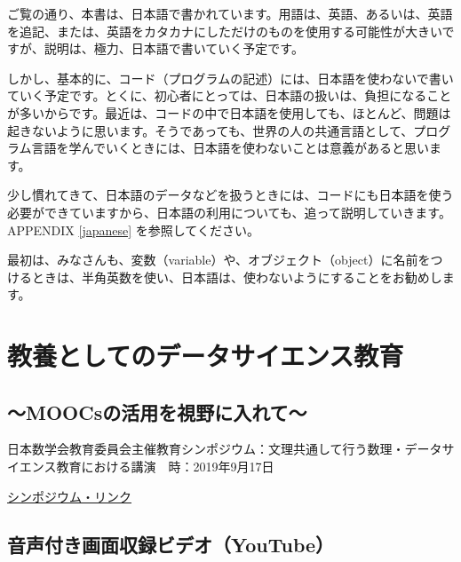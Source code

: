 \documentclass[
]{book}
\theoremstyle{definition}
\theoremstyle{definition}
\theoremstyle{definition}
\theoremstyle{definition}
\theoremstyle{remark}
\begin{document}
ご覧の通り、本書は、日本語で書かれています。用語は、英語、あるいは、英語を追記、または、英語をカタカナにしただけのものを使用する可能性が大きいですが、説明は、極力、日本語で書いていく予定です。

しかし、基本的に、コード（プログラムの記述）には、日本語を使わないで書いていく予定です。とくに、初心者にとっては、日本語の扱いは、負担になることが多いからです。最近は、コードの中で日本語を使用しても、ほとんど、問題は起きないように思います。そうであっても、世界の人の共通言語として、プログラム言語を学んでいくときには、日本語を使わないことは意義があると思います。

少し慣れてきて、日本語のデータなどを扱うときには、コードにも日本語を使う必要ができていますから、日本語の利用についても、追って説明していきます。APPENDIX \ref{japanese} を参照してください。

最初は、みなさんも、変数（variable）や、オブジェクト（object）に名前をつけるときは、半角英数を使い、日本語は、使わないようにすることをお勧めします。

\hypertarget{appendix-appendix}{%
\appendix}


\hypertarget{math2019}{%
\chapter{教養としてのデータサイエンス教育}\label{math2019}}

\hypertarget{moocsux306eux6d3bux7528ux3092ux8996ux91ceux306bux5165ux308cux3066}{%
\section*{～MOOCsの活用を視野に入れて～}\label{moocsux306eux6d3bux7528ux3092ux8996ux91ceux306bux5165ux308cux3066}}

日本数学会教育委員会主催教育シンポジウム：文理共通して行う数理・データサイエンス教育における講演　時：2019年9月17日

\href{https://www.mathsoc.jp/overview/committee/education/sympo/2019sep.html}{シンポジウム・リンク}

\hypertarget{ux97f3ux58f0ux4ed8ux304dux753bux9762ux53ceux9332ux30d3ux30c7ux30aayoutube}{%
\section{音声付き画面収録ビデオ（YouTube）}\label{ux97f3ux58f0ux4ed8ux304dux753bux9762ux53ceux9332ux30d3ux30c7ux30aayoutube}}
\end{document}
